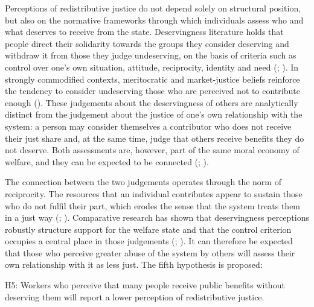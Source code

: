 \documentclass[
  12pt,
]{article}
\begin{document}
Perceptions of redistributive justice do not depend solely on structural
position, but also on the normative frameworks through which individuals
assess who and what deserves to receive from the state. Deservingness
literature holds that people direct their solidarity towards the groups
they consider deserving and withdraw it from those they judge
undeserving, on the basis of criteria such as control over one's own
situation, attitude, reciprocity, identity and need
(;
). In strongly
commodified contexts, meritocratic and market-justice beliefs reinforce
the tendency to consider undeserving those who are perceived not to
contribute enough (). These judgements about the deservingness of others are
analytically distinct from the judgement about the justice of one's own
relationship with the system: a person may consider themselves a
contributor who does not receive their just share and, at the same time,
judge that others receive benefits they do not deserve. Both assessments
are, however, part of the same moral economy of welfare, and they can be
expected to be connected (;
).

The connection between the two judgements operates through the norm of
reciprocity. The resources that an individual contributes appear to
sustain those who do not fulfil their part, which erodes the sense that
the system treats them in a just way
(;
).
Comparative research has shown that deservingness perceptions robustly
structure support for the welfare state and that the control criterion
occupies a central place in those judgements
(;
). It can
therefore be expected that those who perceive greater abuse of the
system by others will assess their own relationship with it as less
just. The fifth hypothesis is proposed:

\begin{tcolorbox}[enhanced jigsaw, arc=.35mm, bottomrule=.15mm, breakable, colback=white, colframe=quarto-callout-color-frame, left=2mm, leftrule=.75mm, opacityback=0, rightrule=.15mm, toprule=.15mm]

H5: Workers who perceive that many people receive public benefits
without deserving them will report a lower perception of redistributive
justice.

\end{tcolorbox}
\end{document}
